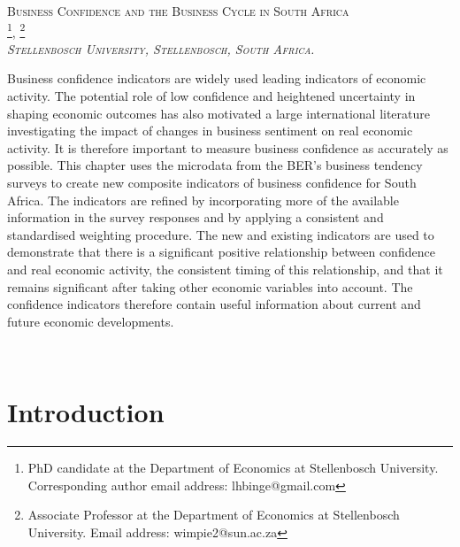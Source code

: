 \documentclass[11pt,]{article}
\title{}
\author{}
\date{}
\let\rmarkdownfootnote\footnote%
\def\footnote{\protect\rmarkdownfootnote}
\begin{document}
\begin{center}
\Large\scshape{Business Confidence and the Business Cycle in South Africa} \\ 
\vspace{1em}
\large{}\footnote{PhD candidate at the Department of Economics at Stellenbosch University. Corresponding author email address: lhbinge@gmail.com},
\large{}\footnote{Associate Professor at the Department of Economics at Stellenbosch University. Email address: wimpie2@sun.ac.za} \\
\normalsize\textit{Stellenbosch University, Stellenbosch, South Africa.} \\
\normalsize\normalfont{\today} 
\end{center}\begin{small}

Business confidence indicators are widely used leading indicators of economic activity. The potential role of low confidence and heightened uncertainty in shaping economic outcomes has also motivated a large international literature investigating the impact of changes in business sentiment on real economic activity. It is therefore important to measure business confidence as accurately as possible. This chapter uses the microdata from the BER's business tendency surveys to create new composite indicators of business confidence for South Africa. The indicators are refined by incorporating more of the available information in the survey responses and by applying a consistent and standardised weighting procedure. The new and existing indicators are used to demonstrate that there is a significant positive relationship between confidence and real economic activity, the consistent timing of this relationship, and that it remains significant after taking other economic variables into account. The confidence indicators therefore contain useful information about current and future economic developments. 

\vspace{0.5em}
 \\
\end{small}\renewcommand{\thefootnote}{\arabic{footnote}}

\renewcommand{\thefootnote}{\arabic{footnote}}

\section{Introduction}\label{introduction}
\end{document}
